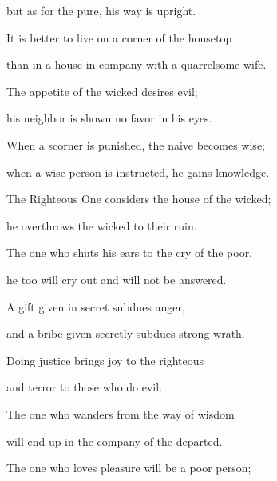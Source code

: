 {\par }{\Q but as for the pure,
his way is upright.
\par }{\Q {}It is better
to live
on
a corner
of the housetop
\par }{\Q than in a house
in company
with a quarrelsome
wife.
\par }{\Q {}The appetite
of the wicked
desires
evil;
\par }{\Q his neighbor
is shown no
favor
in his eyes.
\par }{\Q {}When
a scorner
is punished,
the naive
becomes wise;
\par }{\Q when
a wise
person is instructed,
he gains
knowledge.
\par }{\Q {}The Righteous
One considers
the house
of the wicked;
\par }{\Q he overthrows
the wicked
to their ruin.
\par }{\Q {}The one who shuts
his ears
to the cry
of the poor,
\par }{\Q he too
will cry out
and will not
be answered.
\par }{\Q {}A gift
given in secret
subdues
anger,
\par }{\Q and a bribe
given secretly
subdues strong
wrath.
\par }{\Q {}Doing
justice
brings
joy
to the righteous
\par }{\Q and terror
to those who do
evil.
\par }{\Q {}The one
who wanders
from the way
of wisdom
\par }{\Q will end up in the company
of the departed.
\par }{\Q {}The one who
loves
pleasure
will be a poor person;

}
